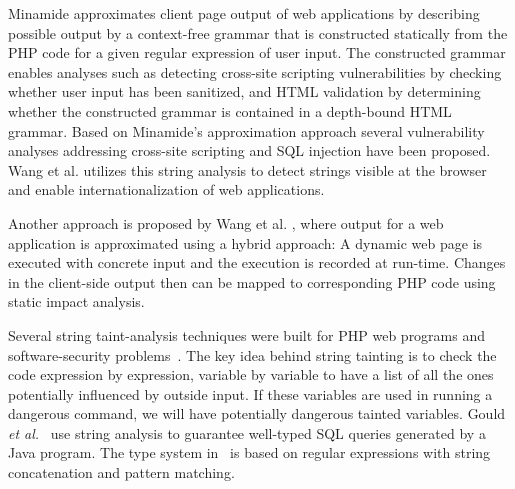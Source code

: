 Minamide \cite{minamide_static_2005} approximates client page output
of web applications by describing possible output by a context-free
grammar that is constructed statically from the PHP code for a given regular
expression of user input. The constructed grammar enables analyses such as
detecting cross-site scripting vulnerabilities by checking whether user input
has been sanitized, and HTML validation by determining whether the constructed
grammar is contained in a depth-bound HTML grammar. Based on Minamide's
approximation approach several vulnerability analyses addressing cross-site
scripting \cite{wassermann_static_2008} and SQL injection
\cite{wassermann2007sound} have been proposed. Wang et al.
\cite{wang_locating_2010} utilizes this string analysis to detect strings
visible at the browser and enable internationalization of web applications.
    
Another approach is proposed by Wang et al. \cite{wang_automating_2012}, where
output for a web application is approximated using a hybrid approach: A
dynamic web page is executed with concrete input and the execution is
recorded at run-time. Changes in the client-side output then can be mapped to 
corresponding PHP code using static impact analysis.


Several string taint-analysis techniques were built for PHP web
programs and software-security
problems~\cite{kieyzun09,su-icse08,xieaiken06,tevfik11}.  The key idea
behind string tainting is to check the code expression by expression,
variable by variable to have a list of all the ones potentially
influenced by outside input.  If these variables are used in running a
dangerous command, we will have potentially dangerous tainted
variables.
%
Gould {\em et al.}~\cite{gould04} use string analysis to guarantee
well-typed SQL queries generated by a Java program. The type system
in~\cite{tabuchi03} is based on regular expressions with string
concatenation and pattern matching.  

